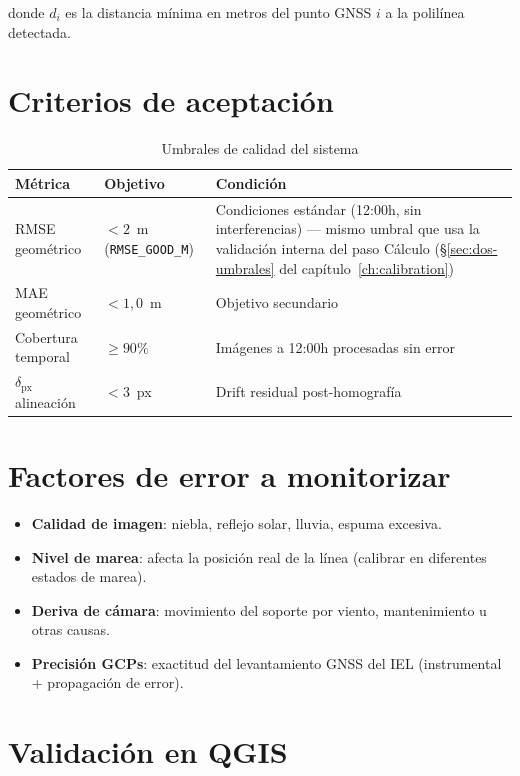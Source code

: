 donde $d_i$ es la distancia mínima en metros del punto GNSS $i$ a la polilínea detectada.

\section{Criterios de aceptación}

\begin{table}[H]
\centering
\caption{Umbrales de calidad del sistema}
\begin{tabular}{L{4cm} C{3cm} L{5.5cm}}
\toprule
\textbf{Métrica} & \textbf{Objetivo} & \textbf{Condición} \\
\midrule
RMSE geométrico    & $< 2$~m (\texttt{RMSE\_GOOD\_M}) & Condiciones estándar (12:00h, sin interferencias) — mismo umbral que usa la validación interna del paso Cálculo (\S\ref{sec:dos-umbrales} del capítulo~\ref{ch:calibration}) \\
MAE geométrico     & $< 1{,}0$~m & Objetivo secundario \\
Cobertura temporal & $\geq 90\%$ & Imágenes a 12:00h procesadas sin error \\
$\delta_\text{px}$ alineación & $< 3$~px & Drift residual post-homografía \\
\bottomrule
\end{tabular}
\end{table}

\section{Factores de error a monitorizar}

\begin{itemize}[leftmargin=1.5em]
  \item \textbf{Calidad de imagen}: niebla, reflejo solar, lluvia, espuma excesiva.
  \item \textbf{Nivel de marea}: afecta la posición real de la línea (calibrar en diferentes estados de marea).
  \item \textbf{Deriva de cámara}: movimiento del soporte por viento, mantenimiento u otras causas.
  \item \textbf{Precisión GCPs}: exactitud del levantamiento GNSS del IEL (instrumental + propagación de error).
\end{itemize}

\section{Validación en QGIS}

